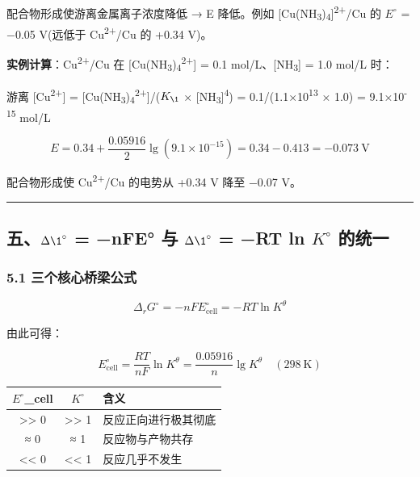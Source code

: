 配合物形成使游离金属离子浓度降低 → E 降低。例如 {[}Cu(NH\textsubscript{3})\textsubscript{4}{]}\textsuperscript{2+}/Cu 的 \(E^{\circ}\) = −0.05 V(远低于 Cu\textsuperscript{2+}/Cu 的 +0.34 V)。

\textbf{实例计算}：Cu\textsuperscript{2+}/Cu 在 {[}Cu(NH\textsubscript{3})\textsubscript{4}\textsuperscript{2+}{]} = 0.1 mol/L、{[}NH\textsubscript{3}{]} = 1.0 mol/L 时：

游离 {[}Cu\textsuperscript{2+}{]} = {[}Cu(NH\textsubscript{3})\textsubscript{4}\textsuperscript{2+}{]}/(\(K_{\1}\) × {[}NH\textsubscript{3}{]}\textsuperscript{4}) = 0.1/(1.1×10\textsuperscript{13} × 1.0) = 9.1×10\textsuperscript{-15} mol/L

\[E = 0.34 + \frac{0.05916}{2}\lg(9.1\times10^{-15}) = 0.34 - 0.413 = -0.073\ \mathrm{V}\]

配合物形成使 Cu\textsuperscript{2+}/Cu 的电势从 +0.34 V 降至 −0.07 V。

\begin{center}\rule{0.5\linewidth}{0.5pt}\end{center}

\subsection{\texorpdfstring{五、\(\Delta \1^{\circ}\) = −nFE° 与 \(\Delta \1^{\circ}\) = −RT ln \(K^{\circ}\) 的统一}{五、\textbackslash Delta \textbackslash1\^{}\{\textbackslash circ\} = −nFE° 与 \textbackslash Delta \textbackslash1\^{}\{\textbackslash circ\} = −RT ln K\^{}\{\textbackslash circ\} 的统一}}\label{ux4e94delta-1circ-nfe-ux4e0e-delta-1circ-rt-ln-kcirc-ux7684ux7edfux4e00}

\subsubsection{5.1 三个核心桥梁公式}\label{ux4e09ux4e2aux6838ux5fc3ux6865ux6881ux516cux5f0f}

\[
\boxed{\Delta_rG^\circ = -nFE^\circ_{\text{cell}} = -RT\ln K^\theta}
\]

由此可得：

\[
E^\circ_{\text{cell}} = \frac{RT}{nF}\ln K^\theta = \frac{0.05916}{n}\lg K^\theta \quad (298\ \mathrm{K})
\]

{\def\LTcaptype{none} %
\begin{longtable}[]{@{}ccl@{}}
\toprule\noalign{}
\(E^{\circ}\)\_cell & \(K^{\circ}\) & 含义 \\
\midrule\noalign{}
\endhead
\bottomrule\noalign{}
\endlastfoot
\textgreater\textgreater{} 0 & \textgreater\textgreater{} 1 & 反应正向进行极其彻底 \\
≈ 0 & ≈ 1 & 反应物与产物共存 \\
\textless\textless{} 0 & \textless\textless{} 1 & 反应几乎不发生 \\
\end{longtable}
}

